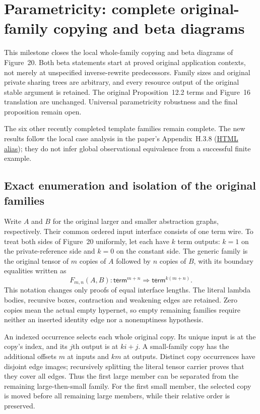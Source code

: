 \clearpage
\section{Parametricity: complete original-family copying and beta diagrams}
\label{sec:parametricity-family-diagrams}
This milestone closes the local whole-family copying and beta diagrams of
Figure~20. Both beta statements start at proved original application contexts,
not merely at unspecified inverse-rewrite predecessors. Family sizes and
original private sharing trees are arbitrary, and every resource output of
the original stable argument is retained. The original Proposition~12.2 terms
and Figure~16 translation are unchanged. Universal parametricity robustness
and the final proposition remain open.

The six other recently completed template families remain complete. The new
results follow the local case analysis in the paper's Appendix~H.3.8
(\href{https://arxiv.org/html/1907.01257v5#A8.SS3.SSS8}{HTML alias}); they
do not infer global observational equivalence from a successful finite example.

\subsection{Exact enumeration and isolation of the original families}
Write $A$ and $B$ for the original larger and smaller abstraction graphs,
respectively. Their common ordered input interface consists of one term
wire. To treat both sides of Figure~20 uniformly, let each have $k$ term
outputs: $k=1$ on the private-reference side and $k=0$ on the constant side.
The generic family is the original tensor of $m$ copies of $A$ followed by
$n$ copies of $B$, with its boundary equalities written as
\[
 F_{m,n}(A,B):\mathsf{term}^{m+n}
       \Rightarrow\mathsf{term}^{k(m+n)}.
\]
This notation changes only proofs of equal interface lengths. The literal
lambda bodies, recursive boxes, contraction and weakening edges are retained.
Zero copies mean the actual empty hypernet, so empty remaining families
require neither an inserted identity edge nor a nonemptiness hypothesis.

An indexed occurrence selects each whole original copy. Its unique input
is at the copy's index, and its $j$th output is at $ki+j$. A small-family
copy has the additional offsets $m$ at inputs and $km$ at outputs. Distinct
copy occurrences have disjoint edge images; recursively splitting the
literal tensor carrier proves that they cover all edges. Thus the first
large member can be separated from the remaining large-then-small family.
For the first small member, the selected copy is moved before all remaining
large members, while their relative order is preserved.

